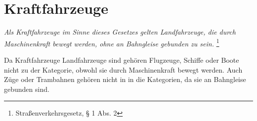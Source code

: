 \chapter{Kraftfahrzeuge}
\textit{Als Kraftfahrzeuge im Sinne dieses Gesetzes gelten Landfahrzeuge, die durch Maschinenkraft bewegt werden, ohne an Bahngleise gebunden zu sein.}
\footnote{Straßenverkehrsgesetz, § 1 Abs. 2}

Da Kraftfahrzeuge Landfahrzeuge sind gehören Flugzeuge, Schiffe oder Boote nicht zu der Kategorie, obwohl sie durch Maschinenkraft bewegt werden.
Auch Züge oder Trambahnen gehören nicht in in die Kategorien, da sie an Bahngleise gebunden sind.




